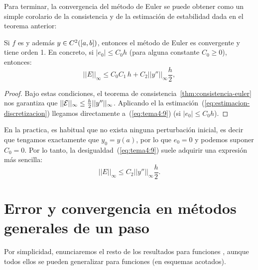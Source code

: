 Para terminar, la convergencia del método de Euler se puede obtener
como un simple corolario de la consistencia y de la estimación de
estabilidad dada en el teorema anterior:

\begin{corollary}
  \label{cor:euler:convergencia-y-orden}
  Si $f$ es \globLipschitz y además $y\in C^2([a,b])$, entonces el método de Euler es
  convergente y tiene orden 1. En concreto, si $|e_0|\le C_0 h$ (para
  alguna constante $C_0\ge 0$), entonces:
  \begin{equation}
    \label{eq:tema4:9}
    ||E||_\infty \le C_0 C_1 \, h + C_2 ||y''||_\infty \frac h2,
  \end{equation}
\end{corollary}

\begin{proof}
  Bajo estas condiciones, el teorema de
  consistencia~\ref{thm:consistencia-euler} nos garantiza que
  $||{\cal E}||_\infty \le \frac h2 ||y''||_\infty$. Aplicando el
  la estimación~(\ref{eq:estimacion-discretizacion}) llegamos
  directamente a~(\ref{eq:tema4:9}) (si $|e_0|\le C_0 h$). 
\end{proof} 

\begin{remark}
  \label{rk:8}
  En la practica, es habitual que no exista ninguna perturbación
  inicial, es decir que tengamos exactamente que $y_0=y(a)$, por lo
  que $e_0=0$ y podemos suponer $C_0=0$. Por lo tanto, la
  desigualdad~(\ref{eq:tema4:9}) suele adquirir una expresión más
  sencilla:
    \begin{equation}
    \label{eq:tema4:9}
    ||E||_\infty \le C_2 ||y''||_\infty \frac h2.
  \end{equation}
\end{remark}

\section{Error y convergencia en métodos generales de un paso}
\label{sec:convergencia-metodos-1paso}

Por simplicidad, enunciaremos  el resto de los resultados para
funciones \globLipschitz, aunque todos ellos se pueden generalizar para
funciones \locLipschitz (en esquemas acotados). %


